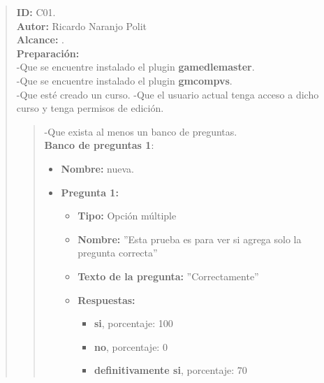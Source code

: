 

\begin{quote} %
	\textbf{ID:} C01.\\
    \textbf{Autor: } Ricardo Naranjo Polit\\
	\textbf{Alcance:}  .\\
    \textbf{Preparación:}\\
      -Que se encuentre instalado el plugin {\bf gamedlemaster}.\\
      -Que se encuentre instalado el plugin {\bf gmcompvs}.\\
      -Que esté creado un curso.
			-Que el usuario actual tenga acceso a dicho curso y tenga permisos de edición.
      \begin{quote}
      -Que exista al menos un banco de preguntas.\\
      \textbf{Banco de preguntas 1}:
        	\begin{itemize} %
                \item \textbf{Nombre:} nueva.
                \item \textbf{Pregunta 1:}
                \begin{itemize}
                  \item \textbf{Tipo:} Opción múltiple
                  \item \textbf{Nombre:} ''Esta prueba es para ver si agrega solo la pregunta correcta''
                  \item \textbf{Texto de la pregunta:} ''Correctamente''
                  \item \textbf{Respuestas:}
                  \begin{itemize}
                    \item \textbf{si}, porcentaje: 100
                    \item \textbf{no}, porcentaje: 0
                    \item \textbf{definitivamente si}, porcentaje: 70
                  \end{itemize}
                \end{itemize}


\end{itemize}
\end{quote}
\end{quote}
